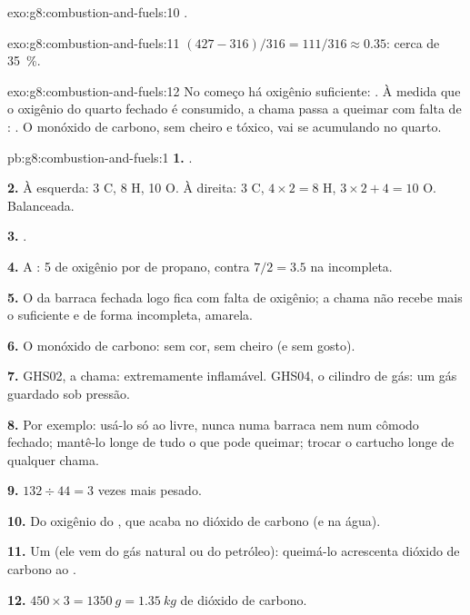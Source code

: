 \begin{solution}{exo:g8:combustion-and-fuels:10}
.
\end{solution}

\begin{solution}{exo:g8:combustion-and-fuels:11}
$(427 - 316)/316 = 111/316 \approx 0.35$: cerca de \qty{35}{\percent}.
\end{solution}

\begin{solution}{exo:g8:combustion-and-fuels:12}
No começo há oxigênio suficiente: . À medida
que o oxigênio do quarto fechado é consumido, a chama passa a queimar
com falta de : . O monóxido de carbono,
sem cheiro e tóxico, vai se acumulando no quarto.
\end{solution}

\begin{solution}{pb:g8:combustion-and-fuels:1}
\textbf{1.} .

\textbf{2.} À esquerda: 3 C, 8 H, 10 O. À direita: 3 C, $4 \times 2 = 8$ H,
$3 \times 2 + 4 = 10$ O. Balanceada.

\textbf{3.} .

\textbf{4.} A : 5  de oxigênio por 
de propano, contra $7/2 = 3.5$ na incompleta.

\textbf{5.} O  da barraca fechada logo fica com falta de oxigênio; a
chama não recebe mais o suficiente e  de forma incompleta,
amarela.

\textbf{6.} O monóxido de carbono: sem cor, sem cheiro (e sem gosto).

\textbf{7.} GHS02, a chama: extremamente inflamável. GHS04, o cilindro
de gás: um gás guardado sob pressão.

\textbf{8.} Por exemplo: usá-lo só ao  livre, nunca numa barraca nem
num cômodo fechado; mantê-lo longe de tudo o que pode queimar; trocar o
cartucho longe de qualquer chama.

\textbf{9.} $132 \div 44 = 3$ vezes mais pesado.

\textbf{10.} Do oxigênio do , que acaba no dióxido de carbono (e na
água).

\textbf{11.} Um  (ele vem do gás natural ou do
petróleo): queimá-lo acrescenta dióxido de carbono ao .

\textbf{12.} $450 \times 3 = \qty{1350}{g} = \qty{1.35}{kg}$ de dióxido
de carbono.
\end{solution}
